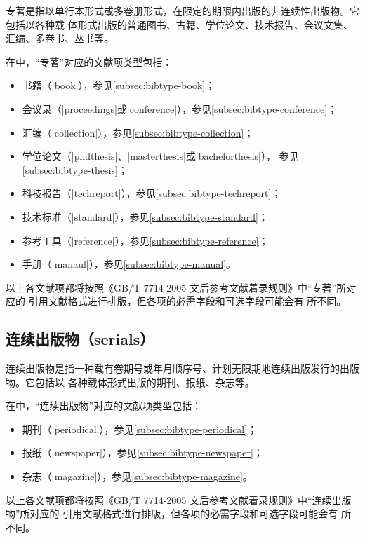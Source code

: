 专著是指以单行本形式或多卷册形式，在限定的期限内出版的非连续性出版物。它包括以各种载
体形式出版的普通图书、古籍、学位论文、技术报告、会议文集、汇编、多卷书、丛书等。

在{\njuthesis}中，“专著”对应的{\BibTeX}文献项类型包括：
\begin{itemize}
\item 书籍（|book|），参见\ref{subsec:bibtype-book}；
\item 会议录（|proceedings|或|conference|），参见\ref{subsec:bibtype-conference}；
\item 汇编（|collection|），参见\ref{subsec:bibtype-collection}；
\item 学位论文（|phdthesis|、|masterthesis|或|bachelorthesis|），
 参见\ref{subsec:bibtype-thesis}；
\item 科技报告（|techreport|），参见\ref{subsec:bibtype-techreport}；
\item 技术标准（|standard|），参见\ref{subsec:bibtype-standard}；
\item 参考工具（|reference|），参见\ref{subsec:bibtype-reference}；
\item 手册（|manaul|），参见\ref{subsec:bibtype-manual}。
\end{itemize}

以上各文献项都将按照《GB/T 7714-2005 文后参考文献着录规则》中“专著”所对应的
引用文献格式进行排版\cite{gbt7714-2005}，但各项的必需字段和可选字段可能会有
所不同。

\subsection{连续出版物（serials）}

连续出版物是指一种载有卷期号或年月顺序号、计划无限期地连续出版发行的出版物。它包括以
各种载体形式出版的期刊、报纸、杂志等。

在{\njuthesis}中，“连续出版物”对应的{\BibTeX}文献项类型包括：
\begin{itemize}
\item 期刊（|periodical|），参见\ref{subsec:bibtype-periodical}；
\item 报纸（|newspaper|），参见\ref{subsec:bibtype-newspaper}；
\item 杂志（|magazine|），参见\ref{subsec:bibtype-magazine}。
\end{itemize}

以上各文献项都将按照《GB/T 7714-2005 文后参考文献着录规则》中“连续出版物”所对应的
引用文献格式进行排版\cite{gbt7714-2005}，但各项的必需字段和可选字段可能会有
所不同。

